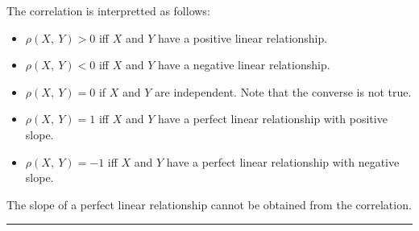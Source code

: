 \documentclass{article}
\begin{document}
\begin{multicols}{3}
    The correlation is interpretted as follows:
    \begin{itemize}
        \item \(\rho\left( X,\: Y \right) > 0\) iff \(X\) and \(Y\) have a positive linear relationship.
        \item \(\rho\left( X,\: Y \right) < 0\) iff \(X\) and \(Y\) have a negative linear relationship.
        \item \(\rho\left( X,\: Y \right) = 0\) if \(X\) and \(Y\) are independent. Note that the converse is not true.
        \item \(\rho\left( X,\: Y \right) = 1\) iff \(X\) and \(Y\) have a perfect linear relationship with positive slope.
        \item \(\rho\left( X,\: Y \right) = -1\) iff \(X\) and \(Y\) have a perfect linear relationship with negative slope.
    \end{itemize}
    The slope of a perfect linear relationship cannot be obtained from the correlation.
\end{multicols}
\hrule
\end{document}
